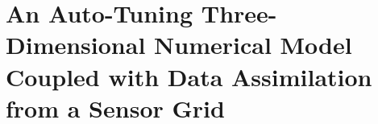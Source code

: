 
\chapter{An Auto-Tuning Three-Dimensional Numerical Model Coupled with Data Assimilation from a Sensor Grid}
\label{physics-aware-chap:orchard}